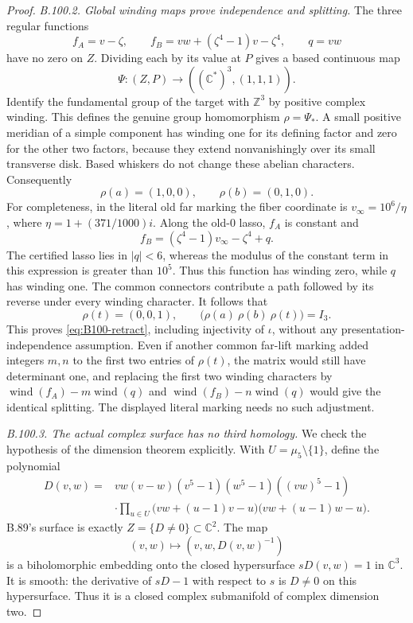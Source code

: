 \begin{proof}
\emph{B.100.2. Global winding maps prove independence and splitting.}
The three regular functions
\begin{equation}\label{eq:B100-functions}
 f_A=v-\zeta,\qquad
 f_B=vw+(\zeta^4-1)v-\zeta^4,\qquad q=vw
\end{equation}
have no zero on $Z$.  Dividing each by its value at $P$ gives a
based continuous map
\[
 \Psi:(Z,P)\longrightarrow((\mathbb C^*)^3,(1,1,1)).
\]
Identify the fundamental group of the target with $\mathbb Z^3$
by positive complex winding.  This defines the genuine group
homomorphism $\rho=\Psi_*$.  A small positive meridian of a
simple component has winding one for its defining factor and zero
for the other two factors, because they extend nonvanishingly
over its small transverse disk.  Based whiskers do not change
these abelian characters.  Consequently
\[
 \rho(a)=(1,0,0),\qquad \rho(b)=(0,1,0).
\]
For completeness, in the literal old far marking the fiber
coordinate is $v_\infty=10^6/\eta$, where
$\eta=1+(371/1000)i$.  Along the old-$0$ lasso, $f_A$ is constant
and
\[
 f_B=(\zeta^4-1)v_\infty-\zeta^4+q.
\]
The certified lasso lies in $|q|<6$, whereas the modulus of the
constant term in this expression is greater than $10^5$.
Thus this function has winding zero, while $q$ has winding one.
The common connectors contribute a path followed by its reverse
under every winding character.  It follows that
\begin{equation}\label{eq:B100-winding-matrix}
 \rho(t)=(0,0,1),\qquad
 \bigl(\rho(a)\ \rho(b)\ \rho(t)\bigr)=I_3.
\end{equation}
This proves \eqref{eq:B100-retract}, including injectivity of
$\iota$, without any presentation-independence assumption.
Even if another common far-lift marking added integers $m,n$
to the first two entries of $\rho(t)$, the matrix would still
have determinant one, and replacing the first two winding
characters by $\operatorname{wind}(f_A)-m\operatorname{wind}(q)$
and $\operatorname{wind}(f_B)-n\operatorname{wind}(q)$ would give
the identical splitting.  The displayed literal marking needs
no such adjustment.

\emph{B.100.3. The actual complex surface has no third homology.}
We check the hypothesis of the dimension theorem explicitly.
With $U=\mu_5\setminus\{1\}$, define the polynomial
\begin{equation}\label{eq:B100-D}
 \begin{aligned}
 D(v,w)={}&vw(v-w)(v^5-1)(w^5-1)((vw)^5-1)\\
 &\cdot\prod_{u\in U}
       \bigl(vw+(u-1)v-u\bigr)
       \bigl(vw+(u-1)w-u\bigr).
 \end{aligned}
\end{equation}
B.89's surface is exactly $Z=\{D\ne0\}\subset\mathbb C^2$.
The map
\[
 (v,w)\longmapsto(v,w,D(v,w)^{-1})
\]
is a biholomorphic embedding onto the closed hypersurface
$sD(v,w)=1$ in $\mathbb C^3$.  It is smooth: the derivative
of $sD-1$ with respect to $s$ is $D\ne0$ on this hypersurface.
Thus it is a closed complex submanifold of complex dimension two.


\end{proof}
